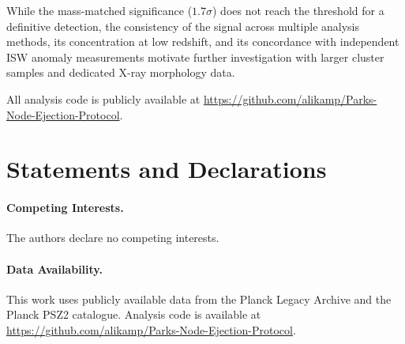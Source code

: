 \documentclass[twocolumn]{article}
\begin{document}
While the mass-matched significance ($1.7\sigma$) does not reach
the threshold for a definitive detection, the consistency of the
signal across multiple analysis methods, its concentration at
low redshift, and its concordance with independent ISW anomaly
measurements motivate further investigation with larger cluster
samples and dedicated X-ray morphology data.

All analysis code is publicly available at
\url{https://github.com/alikamp/Parks-Node-Ejection-Protocol}.

\section*{Statements and Declarations}

\paragraph{Competing Interests.}
The authors declare no competing interests.

\paragraph{Data Availability.}
This work uses publicly available data from the Planck Legacy
Archive and the Planck PSZ2 catalogue.
Analysis code is available at
\url{https://github.com/alikamp/Parks-Node-Ejection-Protocol}.
\end{document}
